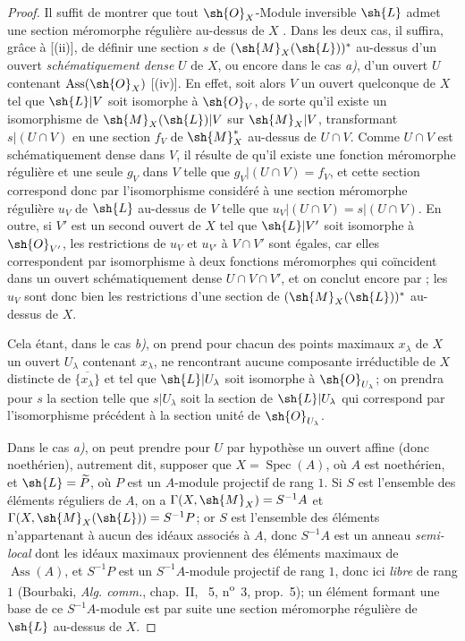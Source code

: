 \begin{proof}
Il suffit de montrer que tout $\sh{O}_X$-Module inversible $\sh{L}$ admet une section méromorphe régulière au-dessus de $X$ .
Dans les deux cas, il suffira, grâce à [(ii)], de définir une section $s$ de $(\sh{M}_X(\sh{L}))^*$ au-dessus d'un ouvert \emph{schématiquement dense} $U$ de $X$, ou encore dans le cas \emph{a)}, d'un ouvert $U$ contenant $\operatorname{Ass}(\sh{O}_X)$ [(iv)].
En effet, soit alors $V$ un ouvert quelconque de $X$ tel que $\sh{L}|V$ soit isomorphe à $\sh{O}_V$, de sorte qu'il existe un isomorphisme de $\sh{M}_X(\sh{L})|V$ sur $\sh{M}_X|V$, transformant $s|(U\cap V)$ en une section $f_V$ de $\sh{M}_X^*$ au-dessus de $U\cap V$.
Comme $U\cap V$ est schématiquement dense dans $V$, il résulte de  qu'il existe une fonction méromorphe régulière et une seule $g_V$ dans $V$ telle que $g_V|(U\cap V)=f_V$, et cette section correspond donc par l'isomorphisme considéré à une section méromorphe régulière $u_V$ de $\sh{L}$ au-dessus de $V$ telle que $u_V|(U\cap V)=s|(U\cap V)$.
En outre, si $V'$ est un second ouvert de $X$ tel que $\sh{L}|V'$ soit isomorphe à $\sh{O}_{V'}$, les restrictions de $u_V$ et $u_{V'}$ à $V\cap V'$ sont égales, car elles correspondent par isomorphisme à deux fonctions méromorphes qui coïncident dans un ouvert schématiquement dense $U\cap V\cap V'$, et on conclut encore par ;
les $u_V$ sont donc bien les restrictions d'une section de $(\sh{M}_X(\sh{L}))^*$ au-dessus de $X$.

Cela étant, dans le cas \emph{b)}, on prend pour chacun des points maximaux $x_\lambda$ de $X$ un ouvert $U_\lambda$ contenant $x_\lambda$, ne rencontrant aucune composante irréductible de $X$ distincte de $\overline{\{x_\lambda\}}$ et tel que $\sh{L}|U_\lambda$ soit isomorphe à $\sh{O}_{U_\lambda}$;
on prendra pour $s$ la section telle que $s|U_\lambda$ soit la section de $\sh{L}|U_\lambda$ qui correspond par l'isomorphisme précédent à la section unité de $\sh{O}_{U_\lambda}$.

Dans le cas \emph{a)}, on peut prendre pour $U$ par hypothèse un ouvert affine (donc noethérien), autrement dit, supposer que $X=\operatorname{Spec}(A)$, où $A$ est noethérien, et $\sh{L}=\widetilde{P}$, où $P$ est un $A$-module projectif de rang $1$.
Si $S$ est l'ensemble des éléments réguliers de $A$, on a $\Gamma(X,\sh{M}_X)=S^{-1}A$  et $\Gamma(X,\sh{M}_X(\sh{L}))=S^{-1}P$;
or $S$ est l'ensemble des éléments n'appartenant à aucun des idéaux associés à $A$, donc $S^{-1}A$ est un anneau \emph{semi-local} dont les idéaux maximaux proviennent des éléments maximaux de $\operatorname{Ass}(A)$, et $S^{-1}P$ est un $S^{-1}A$-module projectif de rang $1$, donc ici \emph{libre} de rang $1$ (Bourbaki, \emph{Alg. comm.}, chap.~II, \textsection~5, n\textsuperscript{o}~3, prop.~5);
un élément formant une base de ce $S^{-1}A$-module est par suite  une section méromorphe régulière de $\sh{L}$ au-dessus de $X$.
\end{proof}

